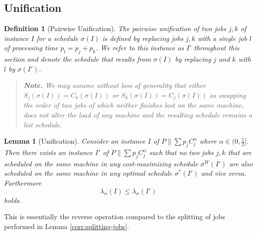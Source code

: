 \documentclass[%
english, titlepage=false %
]{./tum-templates/book/tumbook}
\newtheorem{lemma}{Lemma}
\newtheorem{definition}{Definition}
\begin{document}
\subsection*{Unification}

\begin{definition}[Pairwise Unification]\label{def:pairwise-unification}
    The pairwise unification of two jobs $j,k$ of instance $I$ for a schedule $\sigma(I)$ is defined by replacing jobs $j,k$
    with a single job $l$ of
    processing time $p_l=p_j+p_k$. We refer to this instance as $I'$ throughout this section and denote the
    schedule that results from $\sigma(I)$ by replacing $j$ and $k$ with $l$ by $\sigma(I')$.
    \begin{quote}
        \small\normalfont
        \textbf{Note.}
        We may assume without loss of generality that either
        \(S_j(\sigma(I))=C_k(\sigma(I))\) or
        \(S_k(\sigma(I))=C_j(\sigma(I))\) as swapping the order of two jobs of which neither finishes last on the same machine,
        does not alter the load of any machine and the resulting schedule remains a list schedule.
    \end{quote}
\end{definition}

\begin{lemma}[Unification]\label{corr:unification}
    Consider an instance $I$ of  $P\!\parallel\!\sum p_jC_j^{\alpha}$ where $\alpha \in \Big(0,\frac12\Big]$.
    Then there exists an instance $I'$ of $P\!\parallel\!\sum p_jC_j^{\alpha}$ such that no two jobs
    $j,k$ that are scheduled on the same machine in any cost-maximizing schedule $\sigma^{W}(I')$ are also
    scheduled on the same machine in any optimal schedule $\sigma^{*}(I')$ and vice versa. Furthermore
    \[
    \lambda_{\alpha}(I)\le\lambda_{\alpha}(I')
    \]
    holds.
\end{lemma}

This is essentially the reverse operation compared to the splitting of jobs performed in Lemma \ref{corr:splitting-jobs}.
\end{document}
